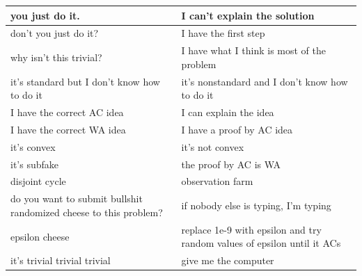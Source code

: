 \begingroup
\footnotesize
\setlength{\tabcolsep}{3pt}
\renewcommand{\arraystretch}{1.15}
\begin{tabular}{|p{}|p{}|}
\hline
\raggedright you just do it. & \raggedright I can't explain the solution \tabularnewline\hline
\raggedright don't you just do it? & \raggedright I have the first step \tabularnewline\hline
\raggedright why isn't this trivial? & \raggedright I have what I think is most of the problem \tabularnewline\hline
\raggedright it's standard but I don't know how to do it & \raggedright it's nonstandard and I don't know how to do it \tabularnewline\hline
\raggedright I have the correct AC idea & \raggedright I can explain the idea \tabularnewline\hline
\raggedright I have the correct WA idea & \raggedright I have a proof by AC idea \tabularnewline\hline
\raggedright it's convex & \raggedright it's not convex \tabularnewline\hline
\raggedright it's subfake & \raggedright the proof by AC is WA \tabularnewline\hline
\raggedright disjoint cycle & \raggedright observation farm \tabularnewline\hline
\raggedright do you want to submit bullshit randomized cheese to this problem? & \raggedright if nobody else is typing, I'm typing \tabularnewline\hline
\raggedright epsilon cheese & \raggedright replace 1e-9 with epsilon and try random values of epsilon until it ACs \tabularnewline\hline
\raggedright it's trivial trivial trivial & \raggedright give me the computer \tabularnewline\hline
\end{tabular}
\endgroup
